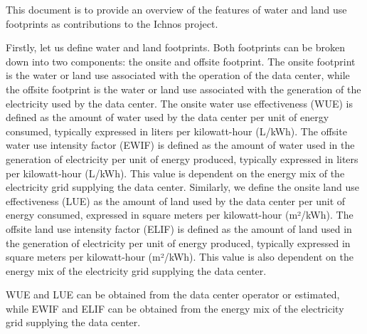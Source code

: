 This document is to provide an overview of the features of water and land use footprints as contributions to the Ichnos project.

Firstly, let us define water and land footprints. Both footprints can be broken down into two components: the onsite and offsite footprint. The onsite footprint is the water or land use associated with the operation of the data center, while the offsite footprint is the water or land use associated with the generation of the electricity used by the data center.
The onsite water use effectiveness (WUE) is defined as the amount of water used by the data center per unit of energy consumed, typically expressed in liters per kilowatt-hour (L/kWh). 
The offsite water use intensity factor (EWIF) is defined as the amount of water used in the generation of electricity per unit of energy produced, typically expressed in liters per kilowatt-hour (L/kWh). This value is dependent on the energy mix of the electricity grid supplying the data center.
Similarly, we define the onsite land use effectiveness (LUE) as the amount of land used by the data center per unit of energy consumed, expressed in square meters per kilowatt-hour (m²/kWh).
The offsite land use intensity factor (ELIF) is defined as the amount of land used in the generation of electricity per unit of energy produced, typically expressed in square meters per kilowatt-hour (m²/kWh). This value is also dependent on the energy mix of the electricity grid supplying the data center.

WUE and LUE can be obtained from the data center operator or estimated, while EWIF and ELIF can be obtained from the energy mix of the electricity grid supplying the data center.

